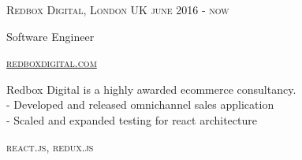 {
  \textsc{\small{Redbox Digital, London UK
    \hfill
      {\raggedleft
        june 2016 - now
      } \\
    }
  }
  {\raggedright\large {
      Software Engineer
  }}

  \textsc{\small\href{http://www.redboxdigital.com}{redboxdigital.com}}

  \normalsize{\raggedright
    Redbox Digital is a highly awarded ecommerce consultancy. \\
    - Developed and released omnichannel sales application \\
    - Scaled and expanded testing for react architecture \\
  }

  \textsc{\small{\color{highlight}
    react.js,
    redux.js
  }}
}
